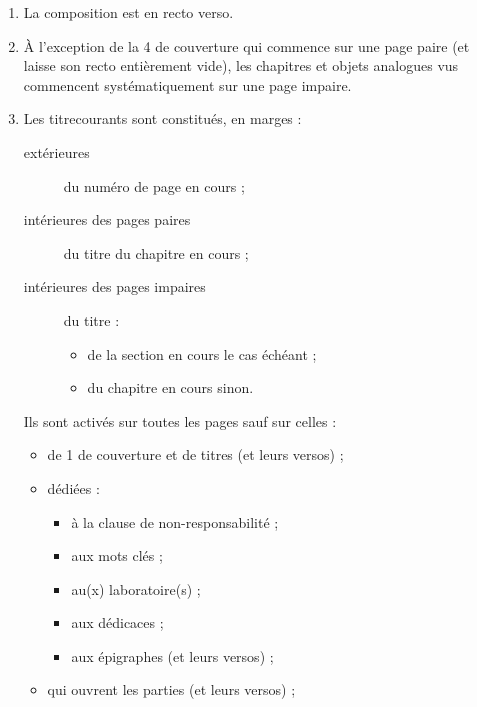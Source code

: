 \begin{enumerate}
\item La composition est en recto verso\exceptoneside.
\item À l'exception de la 4\ieme{} de
  couverture qui commence sur
  une page paire (et laisse
  son recto entièrement vide), les chapitres et objets analogues vus
   commencent
  systématiquement sur une page impaire\exceptoneside.
\item Les \glspl{titrecourant} sont constitués, en marges  :
  \begin{description}
  \item[extérieures] du numéro de page en cours ;
  \item[intérieures des pages paires] du
    titre\titresnormalalternatif{} du chapitre en cours ;
  \item[intérieures des pages impaires] du titre\titresnormalalternatif{} :
    \begin{itemize}
    \item de la section en cours le cas échéant ;
    \item du chapitre en cours sinon.
    \end{itemize}
  \end{description}
  Ils sont activés sur toutes les pages sauf sur celles :
  \begin{itemize}
  \item de 1\iere{} de couverture
    et de titres (et leurs versos) ;
  \item dédiées :
    \begin{itemize}
    \item à la clause de non-responsabilité ;
    \item aux mots clés ;
    \item au(x) laboratoire(s) ;
    \item aux dédicaces ;
    \item aux épigraphes (et leurs versos) ;
    \end{itemize}
  \item qui ouvrent les parties (et leurs versos) ;

\end{itemize}
\end{enumerate}
